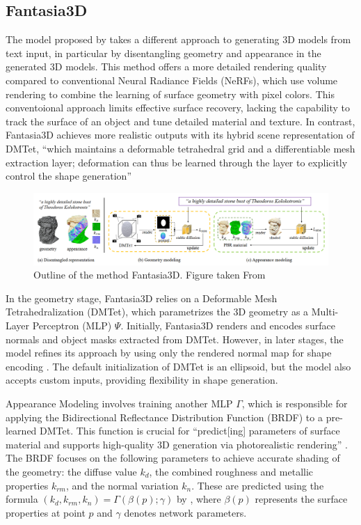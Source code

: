 \subsection{Fantasia3D}\label{fantasia3D}

The model proposed by \citeauthor{chen2023fantasia3d} takes a different approach to generating 3D models from text input, in particular by disentangling geometry and appearance in the generated 3D models.
This method offers a more detailed rendering quality compared to conventional Neural Radiance Fields (NeRFs), which use volume rendering to combine the learning of surface geometry with pixel colors. This conventoional approach limits effective surface recovery, lacking the capability to track the surface of an object and tune detailed material and texture. In contrast, Fantasia3D achieves more realistic outputs with its hybrid scene representation of DMTet, ``which maintains a deformable tetrahedral grid and a differentiable mesh extraction layer; deformation can thus be learned through the layer to explicitly control the shape generation'' \citep{chen2023fantasia3d}

\begin{figure}[ht]
  \centering
    \includegraphics[width=1\columnwidth]{figures/Fantasia3D.png}
    \caption{Outline of the method Fantasia3D. Figure taken From \citep{chen2023fantasia3d}}\label{fig:figureFantasia}
\end{figure}

In the geometry stage, Fantasia3D relies on a Deformable Mesh Tetrahedralization (DMTet), which parametrizes the 3D geometry as a Multi-Layer Perceptron (MLP) \(\Psi\). Initially, Fantasia3D renders and encodes surface normals and object masks extracted from DMTet. However, in later stages, the model refines its approach by using only the rendered normal map for shape encoding \citep{chen2023fantasia3d}. The default initialization of DMTet is an ellipsoid, but the model also accepts custom inputs, providing flexibility in shape generation.

Appearance Modeling involves training another MLP \( \Gamma \), which is responsible for applying the Bidirectional Reflectance Distribution Function (BRDF) to a pre-learned DMTet. This function is crucial for ``predict[ing] parameters of surface material and supports high-quality 3D generation via photorealistic rendering'' \citep{chen2023fantasia3d}. The BRDF focuses on the following parameters to achieve accurate shading of the geometry: the diffuse value \(k_d\), the combined roughness and metallic properties \(k_{rm}\), and the normal variation \(k_n\). These are predicted using the formula \((k_d, k_{rm}, k_n) = \Gamma(\beta(p); \gamma)\) by \citeauthor{chen2023fantasia3d}, where \(\beta(p)\) represents the surface properties at point \(p\) and \(\gamma\) denotes network parameters.

